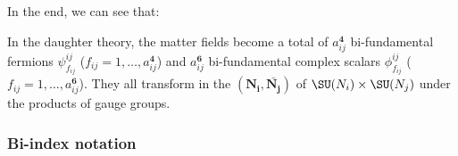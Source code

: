 \documentclass{worksheetclass}
\begin{document}
            In the end, we can see that:
            \begin{result}
                In the daughter theory, the matter fields become a total of $a^{\boldsymbol{4}}_{ij}$ bi-fundamental fermions $\psi^{ij}_{f_{ij}}$ ($f_{ij}=1,\dots,a^{\boldsymbol{4}}_{ij}$) and $a^{\boldsymbol{6}}_{ij}$ bi-fundamental complex scalars $\phi^{ij}_{f_{ij}}$ ($f_{ij}=1,\dots,a^{\boldsymbol{6}}_{ij}$). They all transform in the $(\boldsymbol{\textbf{N}_i},\bar{\boldsymbol{\textbf{N}_j}})$ of $\SU(N_i)\times\SU(N_j)$ under the products of gauge groups.
            \end{result}

        \subsubsection{Bi-index notation}
\end{document}
